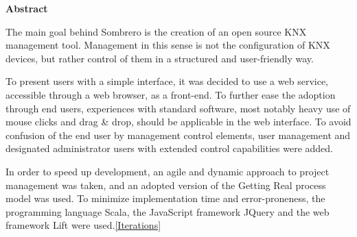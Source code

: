 \begin{flushleft}
	\Large
	\textbf{Abstract\\}
	\vspace{1.5cm}
	
	\large
The main goal behind Sombrero is the creation of an open source KNX management tool. Management in this sense is not the configuration of KNX devices, but rather control of them in a structured and user-friendly way.

To present users with a simple interface, it was decided to use a web service, accessible through a web browser, as a front-end. To further ease the adoption through end users, experiences with standard software, most notably heavy use of mouse clicks and drag \& drop, should be applicable in the web interface. To avoid confusion of the end user by management control elements, user management and designated administrator users with extended control capabilities were added.

In order to speed up development, an agile and dynamic approach to project management was taken, and an adopted version of the Getting Real process model was used. To minimize implementation time and error-proneness, the programming language Scala, the JavaScript framework JQuery and the web framework Lift were used.\ref{Iterations}
\end{flushleft}

